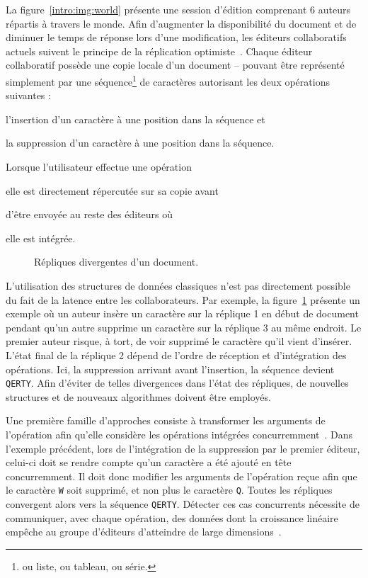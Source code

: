 La figure~\ref{intro:img:world} présente une session d'édition comprenant 6
auteurs répartis à travers le monde. Afin d'augmenter la disponibilité du
document et de diminuer le temps de réponse lors d'une modification, les
éditeurs collaboratifs actuels suivent le principe de la réplication
optimiste~\cite{saito2005optimistic}. Chaque éditeur collaboratif possède une
copie locale d'un document -- pouvant être représenté simplement par une
séquence\footnote{ou liste, ou tableau, ou série.} de caractères autorisant les
deux opérations suivantes :
\begin{inparaenum}[(a)]
\item l'insertion d'un caractère à une position dans la séquence et
\item la suppression d'un caractère à une position dans la séquence.
\end{inparaenum}
Lorsque l'utilisateur effectue une opération
\begin{inparaenum}[(i)]
\item elle est directement répercutée sur sa copie avant
\item d'être envoyée au reste des éditeurs où
\item elle est intégrée.
\end{inparaenum}


\begin{figure}
  
  \caption{\label{intro:fig:ripconvergence} Répliques divergentes d'un
    document.}
\end{figure}

L'utilisation des structures de données \og classiques \fg n'est pas directement
possible du fait de la latence entre les collaborateurs. Par exemple, la
figure~\ref{intro:fig:ripconvergence} présente un exemple où un auteur insère un
caractère sur la réplique 1 en début de document pendant qu'un autre supprime un
caractère sur la réplique 3 au même endroit. Le premier auteur risque, à tort,
de voir supprimé le caractère qu'il vient d'insérer. L'état final de la réplique
2 dépend de l'ordre de réception et d'intégration des opérations. Ici, la
suppression arrivant avant l'insertion, la séquence devient \texttt{QERTY}.
Afin d'éviter de telles divergences dans l'état des répliques, de nouvelles
structures et de nouveaux algorithmes doivent être employés.

Une première famille d'approches consiste à transformer les arguments de
l'opération afin qu'elle considère les opérations intégrées
concurremment~\cite{sun1998operational}. Dans l'exemple précédent, lors de
l'intégration de la suppression par le premier éditeur, celui-ci doit se rendre
compte qu'un caractère a été ajouté en tête concurremment. Il doit donc modifier
les arguments de l'opération reçue afin que le caractère \texttt{W} soit
supprimé, et non plus le caractère \texttt{Q}. Toutes les répliques convergent
alors vers la séquence \texttt{QERTY}.  Détecter ces cas concurrents nécessite
de communiquer, avec chaque opération, des données dont la croissance linéaire
empêche au groupe d'éditeurs d'atteindre de large
dimensions~\cite{charronbost1991concerning, sun2009contextbased}.


